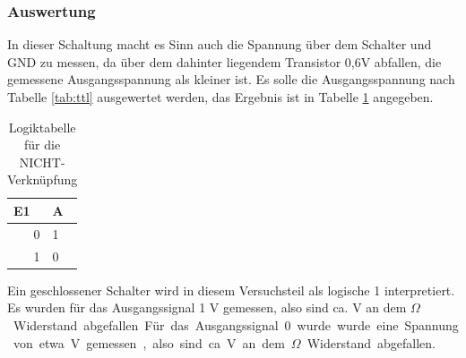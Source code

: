 \documentclass[12pt,a4paper]{article}
\begin{document}
\subsubsection*{Auswertung}

In dieser Schaltung macht es Sinn auch die Spannung über dem Schalter und GND zu messen, da über dem dahinter liegendem Transistor 0,6V abfallen, die gemessene Ausgangsspannung als kleiner ist. Es solle die Ausgangsspannung nach Tabelle \ref{tab:ttl} ausgewertet werden, das Ergebnis ist in Tabelle \ref{tab:1_3} angegeben.

\begin{table}[H]
\begin{center}
\begin{tabular}{r|l}

\multicolumn{1}{l|}{E1} & A \\ \hline \hline
0 & 1 \\ 
1 & 0 \\ 
\end{tabular}
\end{center}
\caption{Logiktabelle für die NICHT-Verknüpfung}
\label{tab:1_3}
\end{table}
Ein geschlossener Schalter wird in diesem Versuchsteil als logische 1 interpretiert.
Es wurden für das Ausgangssignal 1 \unit[4,53]{V} gemessen, also sind ca. \unit[0,47]{V} an dem \unit[100]{$\Omega$} Widerstand abgefallen.
Für das Ausgangssignal 0 wurde wurde eine Spannung von etwa \unit[0,1]{V} gemessen, also sind ca. \unit[4,9]{V} an dem \unit[100]{$\Omega$} Widerstand abgefallen.
\end{document}
